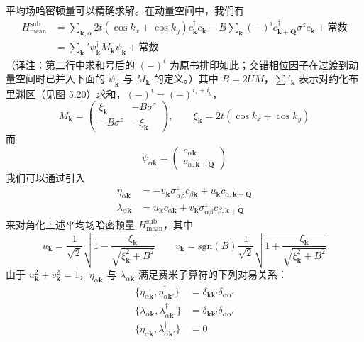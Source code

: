 平均场哈密顿量可以精确求解。在动量空间中，我们有
\begin{align*}
H^{\mathrm{sub}}_{\mathrm{mean}}&=\sum_{\pmb{k},\alpha}2t(\cos k_{x}+\cos k_{y})c^{\dagger}_{\pmb{k}}c_{\pmb{k}}-B\sum_{\pmb{k}}(-)^{i}c^{\dagger}_{\pmb{k}+\pmb{Q}}\sigma^{z}c_{\pmb{k}}+\text{常数}\\
&=\sum_{\pmb{k}}'\psi^{\dagger}_{\pmb{k}}M_{\pmb{k}}\psi_{\pmb{k}}+\text{常数}
\end{align*}
（译注：第二行中求和号后的 $(-)^{i}$ 为原书排印如此；交错相位因子在过渡到动量空间时已并入下面的 $\psi_{\pmb{k}}$ 与 $M_{\pmb{k}}$ 的定义。）其中 $B=2UM$，$\sum'_{\pmb{k}}$ 表示对约化布里渊区（见图 5.20）求和，$(-)^{i}=(-)^{i_{x}+i_{y}}$，
\begin{equation*}
M_{\pmb{k}}=\begin{pmatrix}\xi_{\pmb{k}} & -B\sigma^{z}\\ -B\sigma^{z} & -\xi_{\pmb{k}}\end{pmatrix},\qquad \xi_{\pmb{k}}=2t(\cos k_{x}+\cos k_{y})\tag{5.5.3}
\end{equation*}
而
\begin{equation*}
\psi_{\alpha\pmb{k}}=\begin{pmatrix}c_{\alpha\pmb{k}}\\ c_{\alpha,\pmb{k}+\pmb{Q}}\end{pmatrix}
\end{equation*}
我们可以通过引入
\begin{align*}
\eta_{\alpha\pmb{k}}&=-v_{\pmb{k}}\sigma^{z}_{\alpha\beta}c_{\beta\pmb{k}}+u_{\pmb{k}}c_{\alpha,\pmb{k}+\pmb{Q}}\\
\lambda_{\alpha\pmb{k}}&=u_{\pmb{k}}c_{\alpha\pmb{k}}+v_{\pmb{k}}\sigma^{z}_{\alpha\beta}c_{\beta,\pmb{k}+\pmb{Q}}
\end{align*}
来对角化上述平均场哈密顿量 $H^{\mathrm{sub}}_{\mathrm{mean}}$，其中
\begin{equation*}
u_{\pmb{k}}=\frac{1}{\sqrt{2}}\sqrt{1-\frac{\xi_{\pmb{k}}}{\sqrt{\xi^{2}_{\pmb{k}}+B^{2}}}}\qquad v_{\pmb{k}}=\mathrm{sgn}(B)\frac{1}{\sqrt{2}}\sqrt{1+\frac{\xi_{\pmb{k}}}{\sqrt{\xi^{2}_{\pmb{k}}+B^{2}}}}
\end{equation*}
由于 $u^{2}_{\pmb{k}}+v^{2}_{\pmb{k}}=1$，$\eta_{\alpha\pmb{k}}$ 与 $\lambda_{\alpha\pmb{k}}$ 满足费米子算符的下列对易关系：
\begin{align*}
\{\eta_{\alpha\pmb{k}},\eta^{\dagger}_{\alpha\pmb{k}'}\}&=\delta_{\pmb{k}\pmb{k}'}\delta_{\alpha\alpha'}\\
\{\lambda_{\alpha\pmb{k}},\lambda^{\dagger}_{\alpha\pmb{k}'}\}&=\delta_{\pmb{k}\pmb{k}'}\delta_{\alpha\alpha'}\\
\{\eta_{\alpha\pmb{k}},\lambda^{\dagger}_{\alpha\pmb{k}'}\}&=0
\end{align*}
